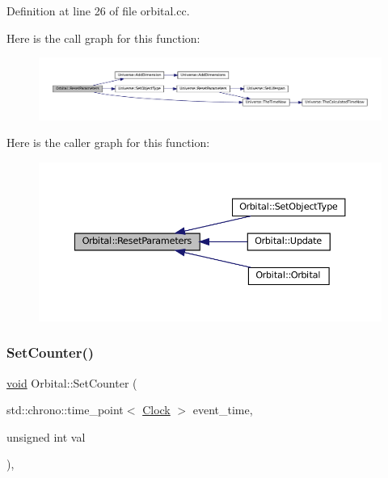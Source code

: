 Definition at line 26 of file orbital.\+cc.

Here is the call graph for this function\+:\nopagebreak
\begin{figure}[H]
\begin{center}
\leavevmode
\includegraphics[width=350pt]{class_orbital_acc6137a5a79be91a255f685a2f065330_cgraph}
\end{center}
\end{figure}
Here is the caller graph for this function\+:\nopagebreak
\begin{figure}[H]
\begin{center}
\leavevmode
\includegraphics[width=350pt]{class_orbital_acc6137a5a79be91a255f685a2f065330_icgraph}
\end{center}
\end{figure}
\mbox{\label{class_orbital_ae2a2fb06700d1d68501b0cbdea87cc08}} 
\subsubsection{\texorpdfstring{Set\+Counter()}{SetCounter()}}
{\footnotesize\ttfamily \mbox{\hyperlink{glad_8h_a950fc91edb4504f62f1c577bf4727c29}{void}} Orbital\+::\+Set\+Counter (\begin{DoxyParamCaption}\item[{std\+::chrono\+::time\+\_\+point$<$ \mbox{\hyperlink{universe_8h_a0ef8d951d1ca5ab3cfaf7ab4c7a6fd80}{Clock}} $>$}]{event\+\_\+time,  }\item[{unsigned int}]{val }\end{DoxyParamCaption})\hspace{0.3cm}{\ttfamily [inline]}, {\ttfamily [virtual]}}



